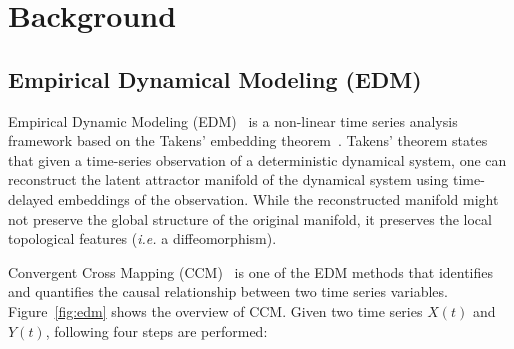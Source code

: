 \documentclass[sigconf]{acmart}
\begin{document}
\section{Background}\label{sec:background}

\subsection{Empirical Dynamical Modeling (EDM)}\label{sec:edm}

Empirical Dynamic Modeling (EDM)~\cite{Chang2017} is a non-linear time
series analysis framework based on the Takens' embedding
theorem~\cite{Deyle2011}. Takens' theorem states that given a time-series
observation of a deterministic dynamical system, one can reconstruct the
latent attractor manifold of the dynamical system using time-delayed
embeddings of the observation. While the reconstructed manifold might not
preserve the global structure of the original manifold, it preserves the local
topological features (\textit{i.e.} a diffeomorphism).

Convergent Cross Mapping (CCM)~\cite{Sugihara2012,Natsukawa2017,VanBerkel2020}
is one of the EDM methods that identifies and quantifies the causal
relationship between two time series variables. Figure~\ref{fig:edm} shows the
overview of CCM\@. Given two time series $X(t)$ and $Y(t)$, following four
steps are performed:
\end{document}
